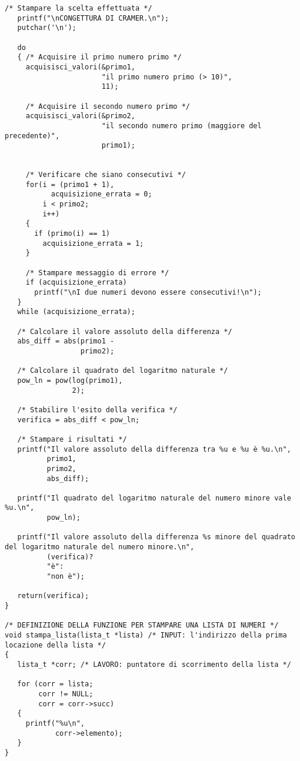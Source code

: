 \documentclass[10pt]{report}
\begin{document}
\begin{lstlisting}[label = {lst:codiceSorgente}]
   /* Stampare la scelta effettuata */
   printf("\nCONGETTURA DI CRAMER.\n");
   putchar('\n');

   do 
   { /* Acquisire il primo numero primo */
     acquisisci_valori(&primo1, 
   	                   "il primo numero primo (> 10)", 
   	                   11);
 
   	 /* Acquisire il secondo numero primo */
   	 acquisisci_valori(&primo2, 
   	                   "il secondo numero primo (maggiore del precedente)", 
   	                   primo1);
        
   	 
     /* Verificare che siano consecutivi */
   	 for(i = (primo1 + 1), 
   	       acquisizione_errata = 0; 
   	     i < primo2; 
   	 	 i++)
   	 {   
   	   if (primo(i) == 1) 
   	     acquisizione_errata = 1;   	 			    	
   	 }

   	 /* Stampare messaggio di errore */
   	 if (acquisizione_errata)		
   	   printf("\nI due numeri devono essere consecutivi!\n");
   }   
   while (acquisizione_errata);
   
   /* Calcolare il valore assoluto della differenza */
   abs_diff = abs(primo1 - 
                  primo2);
   
   /* Calcolare il quadrato del logaritmo naturale */
   pow_ln = pow(log(primo1), 
                2);
       
   /* Stabilire l'esito della verifica */
   verifica = abs_diff < pow_ln;
   
   /* Stampare i risultati */
   printf("Il valore assoluto della differenza tra %u e %u è %u.\n", 
          primo1, 
          primo2, 
          abs_diff);

   printf("Il quadrato del logaritmo naturale del numero minore vale %u.\n",  
          pow_ln);

   printf("Il valore assoluto della differenza %s minore del quadrato del logaritmo naturale del numero minore.\n", 
          (verifica)? 
          "è": 
          "non è");

   return(verifica);
}

/* DEFINIZIONE DELLA FUNZIONE PER STAMPARE UNA LISTA DI NUMERI */
void stampa_lista(lista_t *lista) /* INPUT: l'indirizzo della prima locazione della lista */
{
   lista_t *corr; /* LAVORO: puntatore di scorrimento della lista */

   for (corr = lista; 
        corr != NULL; 
        corr = corr->succ)
   {
   	 printf("%u\n", 
   	        corr->elemento);
   }
}
\end{lstlisting}
\end{document}

